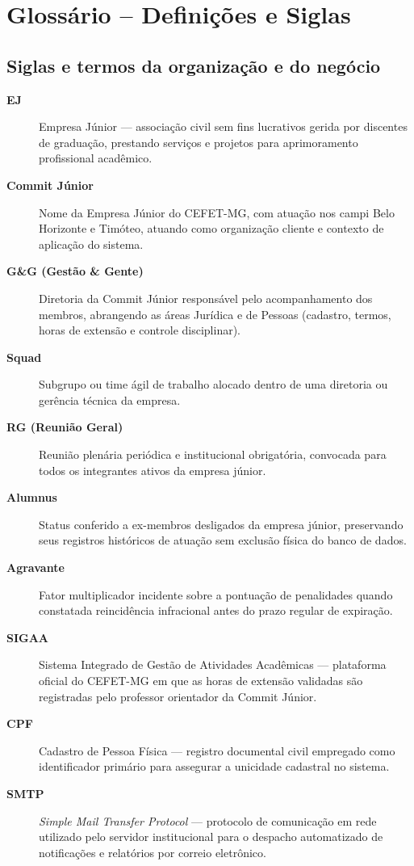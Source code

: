 \chapter{Glossário -- Definições e Siglas}
\label{cap:glossario}

\section*{Siglas e termos da organização e do negócio}

\begin{description}
    \item[\textbf{EJ}] Empresa Júnior --- associação civil sem fins lucrativos gerida por discentes de graduação, prestando serviços e projetos para aprimoramento profissional acadêmico.
    \item[\textbf{Commit Júnior}] Nome da Empresa Júnior do CEFET-MG, com atuação nos campi Belo Horizonte e Timóteo, atuando como organização cliente e contexto de aplicação do sistema.
    \item[\textbf{G\&G (Gestão \& Gente)}] Diretoria da Commit Júnior responsável pelo acompanhamento dos membros, abrangendo as áreas Jurídica e de Pessoas (cadastro, termos, horas de extensão e controle disciplinar).
    \item[\textbf{Squad}] Subgrupo ou time ágil de trabalho alocado dentro de uma diretoria ou gerência técnica da empresa.
    \item[\textbf{RG (Reunião Geral)}] Reunião plenária periódica e institucional obrigatória, convocada para todos os integrantes ativos da empresa júnior.
    \item[\textbf{Alumnus}] Status conferido a ex-membros desligados da empresa júnior, preservando seus registros históricos de atuação sem exclusão física do banco de dados.
    \item[\textbf{Agravante}] Fator multiplicador incidente sobre a pontuação de penalidades quando constatada reincidência infracional antes do prazo regular de expiração.
    \item[\textbf{SIGAA}] Sistema Integrado de Gestão de Atividades Acadêmicas --- plataforma oficial do CEFET-MG em que as horas de extensão validadas são registradas pelo professor orientador da Commit Júnior.
    \item[\textbf{CPF}] Cadastro de Pessoa Física --- registro documental civil empregado como identificador primário para assegurar a unicidade cadastral no sistema.
    \item[\textbf{SMTP}] \textit{Simple Mail Transfer Protocol} --- protocolo de comunicação em rede utilizado pelo servidor institucional para o despacho automatizado de notificações e relatórios por correio eletrônico.
\end{description}

